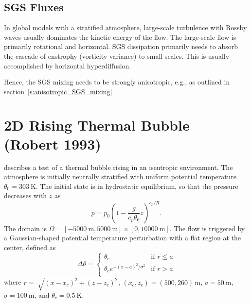 \documentclass{report}
\begin{document}
\subsection{SGS Fluxes}

In global models with a stratified atmosphere, large-scale turbulence with Rossby waves usually dominates the kinetic energy of the flow. The large-scale flow is primarily rotational and horizontal. SGS dissipation primarily needs to absorb the cascade of enstrophy (vorticity variance) to small scales. This is usually accomplished by horizontal hyperdiffusion.

Hence, the SGS mixing needs to be strongly anisotropic, e.g., as outlined in section~\ref{s:anisotropic_SGS_mixing}.

\section{2D Rising Thermal Bubble (Robert 1993)}
\label{2dRTBtest}
\cite{robert1993} describes a test of a thermal bubble rising in an isentropic environment. The atmosphere is initially neutrally stratified with uniform potential temperature $\theta_0 = 303~\mathrm{K}$. The initial state is in hydrostatic equilibrium, so that the pressure decreases with $z$ as
\begin{equation}
\label{pressureDistrib}
p = p_{0}\left(1-\frac{g}{c_p{\theta_{0}}}z\right)^{c_p/R}.
\end{equation}
The domain is $\Omega=[-5000~\mathrm{m},5000~\mathrm{m}]\times[0,10000~\mathrm{m}]$. The flow is triggered by a Gaussian-shaped potential temperature perturbation with a flat region at the center, defined as
\begin{equation}
 \Delta\theta = \left\{ \begin{array}{ll}
 \theta_c & \text{if } r \leq a\\
 \theta_c e^{-(x - a)^2/\sigma^2} & \text{if } r > a\\
\end{array} \right.
\label{eq:robertIni}
\end{equation}
where $r = \sqrt[]{(x-x_{c})^{2} + (z-z_{c})^{2}}$, $(x_c,z_c) = (500,260)\,\mathrm{m}$, $a=50~\mathrm{m}$, $\sigma = 100~\mathrm{m}$, and $\theta_c=0.5~\mathrm{K}$.
\end{document}
